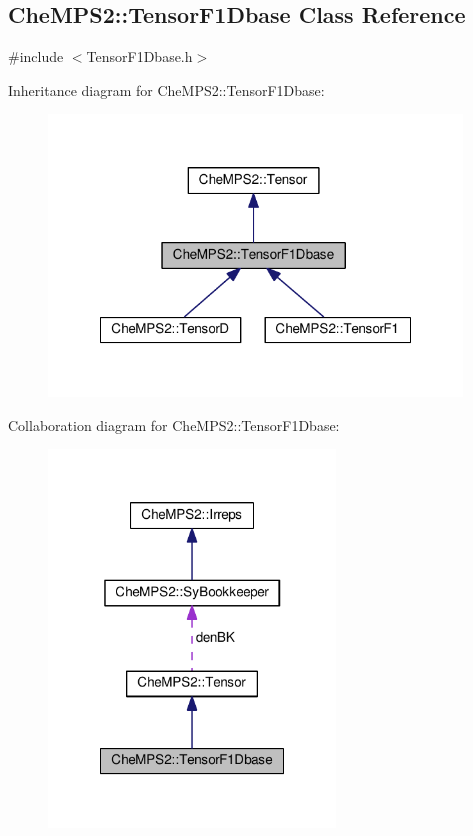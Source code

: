 \hypertarget{classCheMPS2_1_1TensorF1Dbase}{\subsection{Che\-M\-P\-S2\-:\-:Tensor\-F1\-Dbase Class Reference}
\label{classCheMPS2_1_1TensorF1Dbase}
}


{\ttfamily \#include $<$Tensor\-F1\-Dbase.\-h$>$}



Inheritance diagram for Che\-M\-P\-S2\-:\-:Tensor\-F1\-Dbase\-:\nopagebreak
\begin{figure}[H]
\begin{center}
\leavevmode
\includegraphics[width=311pt]{classCheMPS2_1_1TensorF1Dbase__inherit__graph}
\end{center}
\end{figure}


Collaboration diagram for Che\-M\-P\-S2\-:\-:Tensor\-F1\-Dbase\-:\nopagebreak
\begin{figure}[H]
\begin{center}
\leavevmode
\includegraphics[width=216pt]{classCheMPS2_1_1TensorF1Dbase__coll__graph}
\end{center}
\end{figure}
